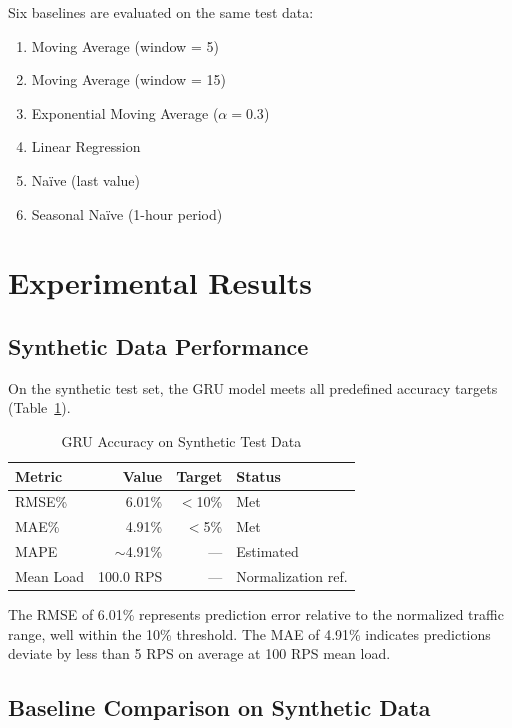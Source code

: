 \documentclass[conference,letterpaper]{IEEEtran}
\begin{document}
Six baselines are evaluated on the same test data:
\begin{enumerate}
    \item Moving Average (window = 5)
    \item Moving Average (window = 15)
    \item Exponential Moving Average ($\alpha = 0.3$)
    \item Linear Regression
    \item Na\"ive (last value)
    \item Seasonal Na\"ive (1-hour period)
\end{enumerate}

\section{Experimental Results}

\subsection{Synthetic Data Performance}

On the synthetic test set, the GRU model meets all predefined accuracy targets (Table~\ref{tab:synthetic}).

\begin{table}[htbp]
\caption{GRU Accuracy on Synthetic Test Data}
\label{tab:synthetic}
\centering
\small
\begin{tabular}{lrrl}
\toprule
\textbf{Metric} & \textbf{Value} & \textbf{Target} & \textbf{Status} \\
\midrule
RMSE\% & 6.01\% & $<$10\% & Met \\
MAE\% & 4.91\% & $<$5\% & Met \\
MAPE & $\sim$4.91\% & --- & Estimated \\
Mean Load & 100.0 RPS & --- & Normalization ref. \\
\bottomrule
\end{tabular}
\end{table}

The RMSE of 6.01\% represents prediction error relative to the normalized traffic range, well within the 10\% threshold. The MAE of 4.91\% indicates predictions deviate by less than 5 RPS on average at 100 RPS mean load.

\subsection{Baseline Comparison on Synthetic Data}
\end{document}
